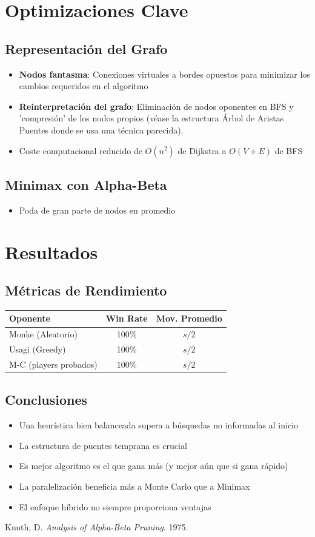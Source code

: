 \documentclass{article}
\begin{document}
\section{Optimizaciones Clave}
\subsection{Representación del Grafo}
\begin{itemize}
\item \textbf{Nodos fantasma}: Conexiones virtuales a bordes opuestos para minimizar los cambios requeridos en el algoritmo
\item \textbf{Reinterpretación del grafo}: Eliminación de nodos oponentes en BFS y 'compresión' de los nodos propios (véase la estructura Árbol de Aristas Puentes donde se usa una técnica parecida).
\item Coste computacional reducido de $O(n^2)$ de Dijkstra a $O(V + E)$ de BFS
\end{itemize}

\subsection{Minimax con Alpha-Beta}
\begin{itemize}
\item Poda de gran parte de nodos en promedio
\end{itemize}

\section{Resultados}
\subsection{Métricas de Rendimiento}
\begin{table}[h]
\centering
\begin{tabular}{|l|c|c|}
\hline
\textbf{Oponente} & \textbf{Win Rate} & \textbf{Mov. Promedio} \\
\hline
Monke (Aleatorio) & 100\% & $s/2$ \\
Usagi (Greedy) & 100\% & $s/2$ \\
M-C (players probados) & 100\% & $s/2$ \\
\hline
\end{tabular}
\end{table}

\subsection{Conclusiones}
\begin{itemize}
\item Una heurística bien balanceada supera a búsquedas no informadas al inicio
\item La estructura de puentes temprana es crucial
\item Es mejor algoritmo es el que gana más (y mejor aún que si gana rápido)
\item La paralelización beneficia más a Monte Carlo que a Minimax
\item El enfoque híbrido no siempre proporciona ventajas
\end{itemize}

\begin{thebibliography}{9}
 Knuth, D. \textit{Analysis of Alpha-Beta Pruning}. 1975.
\end{thebibliography}
\end{document}
